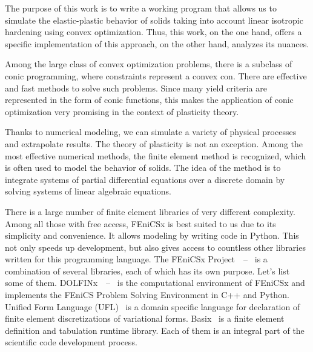 \documentclass[12pt]{article}
\begin{document}
The purpose of this work is to write a working program that allows us to simulate the elastic-plastic behavior of solids taking into account linear isotropic hardening using convex optimization. Thus, this work, on the one hand, offers a specific implementation of this approach, on the other hand, analyzes its nuances.

Among the large class of convex optimization problems, there is a subclass of conic programming, where constraints represent a convex con. There are effective and fast methods to solve such problems. Since many yield criteria are represented in the form of conic functions, this makes the application of conic optimization very promising in the context of plasticity theory.

Thanks to numerical modeling, we can simulate a variety of physical processes and extrapolate results. The theory of plasticity is not an exception. Among the most effective numerical methods, the finite element method is recognized, which is often used to model the behavior of solids. The idea of the method is to integrate systems of partial differential equations over a discrete domain by solving systems of linear algebraic equations. 

There is a large number of finite element libraries of very different complexity. Among all those with free access, FEniCSx is best suited to us due to its simplicity and convenience. It allows modeling by writing code in Python. This not only speeds up development, but also gives access to countless other libraries written for this programming language. The FEniCSx Project~\parencite{FEniCS2015}~--~\parencite{LoggEtal2012} is a combination of several libraries, each of which has its own purpose. Let's list some of them. DOLFINx~\parencite{LoggWells2010}~--~\parencite{LoggEtal_10_2012} is the computational environment of FEniCSx and implements the FEniCS Problem Solving Environment in C++ and Python. Unified Form Language (UFL)~\parencite{UFL2014} is a domain specific language for declaration of finite element discretizations of variational forms. Basix~\parencite{BasixJoss} is a finite element definition and tabulation runtime library. Each of them is an integral part of the scientific code development process.
\end{document}
